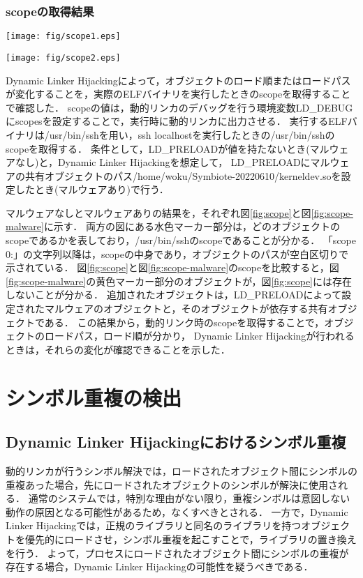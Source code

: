 \documentclass[submit,techreq,noauthor]{eco}	%
\begin{document}
\subsubsection{scopeの取得結果}

\begin{figure*}[t]
	\centering
  \texttt{[image: fig/scope1.eps]}
	\caption{マルウェアなしの/usr/bin/sshのscope}
	\label{fig:scope}
\end{figure*}

\begin{figure*}[t]
	\centering
  \texttt{[image: fig/scope2.eps]}
	\caption{マルウェアありの/usr/bin/sshのscope}
	\label{fig:scope-malware}
\end{figure*}

Dynamic Linker Hijackingによって，オブジェクトのロード順またはロードパスが変化することを，実際のELFバイナリを実行したときのscopeを取得することで確認した．
scopeの値は，動的リンカのデバッグを行う環境変数LD\_DEBUGにscopesを設定することで，実行時に動的リンカに出力させる．
実行するELFバイナリは/usr/bin/sshを用い，ssh localhostを実行したときの/usr/bin/sshのscopeを取得する．
条件として，LD\_PRELOADが値を持たないとき(マルウェアなし)と，Dynamic Linker Hijackingを想定して，
LD\_PRELOADにマルウェアの共有オブジェクトのパス/home/woku/Symbiote-20220610/kerneldev.soを設定したとき(マルウェアあり)で行う．

マルウェアなしとマルウェアありの結果を，それぞれ図\ref{fig:scope}と図\ref{fig:scope-malware}に示す．
両方の図にある水色マーカー部分は，どのオブジェクトのscopeであるかを表しており，/usr/bin/sshのscopeであることが分かる．
「scope 0:」の文字列以降は，scopeの中身であり，オブジェクトのパスが空白区切りで示されている．
図\ref{fig:scope}と図\ref{fig:scope-malware}のscopeを比較すると，図\ref{fig:scope-malware}の黄色マーカー部分のオブジェクトが，図\ref{fig:scope}には存在しないことが分かる．
追加されたオブジェクトは，LD\_PRELOADによって設定されたマルウェアのオブジェクトと，そのオブジェクトが依存する共有オブジェクトである．
この結果から，動的リンク時のscopeを取得することで，オブジェクトのロードパス，ロード順が分かり，
Dynamic Linker Hijackingが行われるときは，それらの変化が確認できることを示した．\\

\section{シンボル重複の検出}
\subsection{Dynamic Linker Hijackingにおけるシンボル重複}
動的リンカが行うシンボル解決では，ロードされたオブジェクト間にシンボルの重複あった場合，先にロードされたオブジェクトのシンボルが解決に使用される．
通常のシステムでは，特別な理由がない限り，重複シンボルは意図しない動作の原因となる可能性があるため，なくすべきとされる．
一方で，Dynamic Linker Hijackingでは，正規のライブラリと同名のライブラリを持つオブジェクトを優先的にロードさせ，シンボル重複を起こすことで，ライブラリの置き換えを行う．
よって，プロセスにロードされたオブジェクト間にシンボルの重複が存在する場合，Dynamic Linker Hijackingの可能性を疑うべきである．
\end{document}

